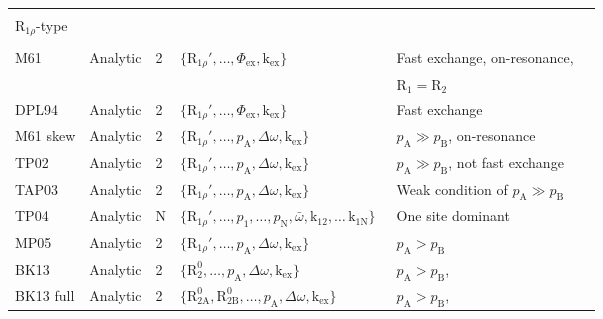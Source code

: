 \documentclass[a4paper,11pt,twoside,openright]{book}
\begin{document}
{\begin{landscape}
\begin{center}
\begin{small}
\begin{longtable}{llllll}
\par
\\[-5pt]
$\mathrm{R}_{1\rho}$-type \\
\cline{1-1}
\\[-5pt]
M61                      & Analytic & 2     & $\{\mathrm{R}_{1\rho}', \dots, \Phi_{\textrm{ex}}, \textrm{k}_{\textrm{ex}}\}$\             & Fast exchange, on-resonance,      & \citet{Meiboom61} \\
                         &          &       &                                                     & $\mathrm{R}_1= \mathrm{R}_2$\  \\
DPL94                    & Analytic & 2     & $\{\mathrm{R}_{1\rho}', \dots, \Phi_{\textrm{ex}}, \textrm{k}_{\textrm{ex}}\}$\             & Fast exchange                     & \citet{Davis94} \\
M61 skew                 & Analytic & 2     & $\{\mathrm{R}_{1\rho}', \dots, p_{\textrm{A}}, \Delta\omega , \textrm{k}_{\textrm{ex}}\}$\           & $p_{\textrm{A}}\gg p_{\textrm{B}}$, on-resonance       & \citet{Meiboom61} \\
TP02                     & Analytic & 2     & $\{\mathrm{R}_{1\rho}', \dots, p_{\textrm{A}}, \Delta\omega , \textrm{k}_{\textrm{ex}}\}$\           & $p_{\textrm{A}}\gg p_{\textrm{B}}$, not fast exchange  & \citet{TrottPalmer02} \\
TAP03                    & Analytic & 2     & $\{\mathrm{R}_{1\rho}', \dots, p_{\textrm{A}}, \Delta\omega , \textrm{k}_{\textrm{ex}}\}$\           & Weak condition of $p_{\textrm{A}}\gg p_{\textrm{B}}$\    & \citet{Trott03} \\
TP04\footnotemark [1]& Analytic & N     & $\{\mathrm{R}_{1\rho}', \dots, p_{\textrm{1}}, \dots, p_{\textrm{N}}, \bar\omega , \textrm{k}_{\textrm{12}}, \dots\, \textrm{k}_{\textrm{1N}}\}$\     & One site dominant        & \citet{TrottPalmer04} \\
MP05                     & Analytic & 2     & $\{\mathrm{R}_{1\rho}', \dots, p_{\textrm{A}}, \Delta\omega , \textrm{k}_{\textrm{ex}}\}$\           & $p_{\textrm{A}}> p_{\textrm{B}}$\                        & \citet{MiloushevPalmer05} \\
BK13                     & Analytic & 2     & $\{\mathrm{R}_2^0, \dots, p_{\textrm{A}}, \Delta\omega , \textrm{k}_{\textrm{ex}}\}$\               & $p_{\textrm{A}}> p_{\textrm{B}}$,                      & \citet{Baldwin2013} \\
BK13 full                & Analytic & 2     & $\{\mathrm{R}_{\mathrm{2A}}^0, \mathrm{R}_{\mathrm{2B}}^0, \dots, p_{\textrm{A}}, \Delta\omega , \textrm{k}_{\textrm{ex}}\}$\  & $p_{\textrm{A}}> p_{\textrm{B}}$,                      & \citet{Baldwin2013} \\

\end{longtable}
\end{small}
\end{center}
\end{landscape}}
\end{document}
